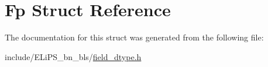 \hypertarget{struct_fp}{}\section{Fp Struct Reference}
\label{struct_fp}


The documentation for this struct was generated from the following file\+:\begin{DoxyCompactItemize}
\item 
include/\+E\+Li\+P\+S\+\_\+bn\+\_\+bls/\hyperlink{field__dtype_8h}{field\+\_\+dtype.\+h}\end{DoxyCompactItemize}
